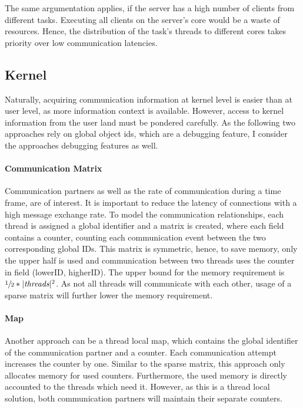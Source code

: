 The same argumentation applies, if the server has a high number of clients from
different tasks.
Executing all clients on the server's core would be a waste of resources.
Hence, the distribution of the task's threads to different cores takes priority
over low communication latencies.


\subsection{Kernel}
Naturally, acquiring communication information at kernel level is easier than
at user level, as more information context is available.
However, access to kernel information from the user land must be pondered carefully.
As the following two approaches rely on global object ids, which are a debugging
feature, I consider the approaches debugging features as well.


\paragraph{Communication Matrix}
Communication partners as well as the rate of communication during a time
frame, are of interest.
It is important to reduce the latency of connections with a high message
exchange rate.
To model the communication relationships, each thread is assigned a global
identifier and a matrix is created, where each field contains a counter,
counting each communication event between the two corresponding global IDs.
This matrix is symmetric, hence, to save memory, only the upper half is used
and communication between two threads uses the counter in field
(lowerID, higherID).
The upper bound for the memory requirement is $\sfrac{1}{2} * |\textit{threads}|^2$.
As not all threads will communicate with each other, usage of a sparse matrix
will further lower the memory requirement.

\paragraph{Map}
Another approach can be a thread local map, which contains the global
identifier of the communication partner and a counter.
Each communication attempt increases the counter by one.
Similar to the sparse matrix, this approach only allocates memory for used
counters.
Furthermore, the used memory is directly accounted to the threads which need it.
However, as this is a thread local solution, both communication partners will
maintain their separate counters.

